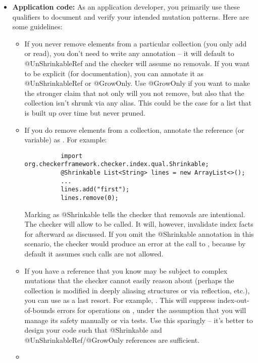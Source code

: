 \begin{itemize}
\item
  \textbf{Application code:}
  As an application developer, you primarily use these qualifiers to document and verify your intended mutation patterns.
  Here are some guidelines:
  \begin{itemize}
    \item
      If you never remove elements from a particular collection (you only add or read), you don’t need to write any
      annotation – it will default to @UnShrinkableRef and the checker will assume no removals. If you want to be explicit
      (for documentation), you can annotate it as @UnShrinkableRef or @GrowOnly. Use @GrowOnly if you want to make the stronger
      claim that not only will you not remove, but also that the collection isn’t shrunk via any alias. This could be the
      case for a list that is built up over time but never pruned.
    \item
      If you do remove elements from a collection, annotate the reference (or variable) as .
      For example:
        \begin{Verbatim}
          import org.checkerframework.checker.index.qual.Shrinkable;
          @Shrinkable List<String> lines = new ArrayList<>();
          ...
          lines.add("first");
          lines.remove(0);
        \end{Verbatim}
      Marking  as @Shrinkable tells the checker that removals are intentional.
      The checker will allow  to be called. It will, however, invalidate index facts for
       afterward as discussed. If you omit the @Shrinkable annotation in this scenario, the checker
      would produce an error at the call to , because by default it assumes such calls are not allowed.
    \item
      If you have a reference that you know may be subject to complex mutations that the checker cannot easily reason
      about (perhaps the collection is modified in deeply aliasing structures or via reflection, etc.), you can use
       as a last resort. For example,
      . This will suppress index-out-of-bounds errors for operations
      on , under the assumption that you will manage its safety manually or via tests. Use this
      sparingly – it’s better to design your code such that @Shrinkable and @UnShrinkableRef/@GrowOnly references are sufficient.
    \item

\end{itemize}
\end{itemize}
